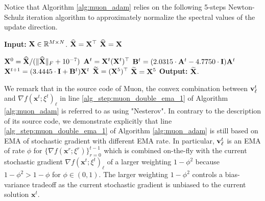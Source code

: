 \documentclass{article}
\theoremstyle{plain}
\theoremstyle{definition}
\theoremstyle{remark}
\def\bx{\mathbf{x}}
\begin{document}
Notice that Algorithm \ref{alg:muon_adam} relies on the following 5-steps Newton-Schulz iteration algorithm to approximately normalize the spectral values of the update direction.
\begin{algorithm}
\caption{Newton-Schulz5}
\begin{algorithmic}[1]
\STATE \textbf{Input:} ${\bf X} \in \mathbb{R}^{M\times N}$.
    \STATE $\widehat{\bf X} = {\bf X}^\top$
\ELSE
    \STATE $\widehat{\bf X} = {\bf X}$
\ENDIF

\STATE ${\bf X}^0 = \widehat{\bf X} / (\| \widehat{\bf X} \|_F + 10^{-7})$
            \STATE ${\bf A}^t = {\bf X}^t({\bf X}^t)^\top $
            \STATE ${\bf B}^t = ( 2.0315 \cdot {\bf A}^t-4.7750 \cdot {\bf I} ){\bf A}^t$
            \STATE ${\bf X}^{t+1} = (3.4445 \cdot {\bf I} + {\bf B}^t) {\bf X}^t$
        \ENDFOR
{}
    \STATE $\widetilde{\bf X} = ({\bf X}^5)^\top$
\ELSE
    \STATE $\widetilde{\bf X} = {\bf X}^5$
\ENDIF
\STATE \textbf{Output:} $\widetilde{\bf X}$.
\end{algorithmic}
\end{algorithm}

We remark that in the source code of Muon, the convex combination between ${\bf v}_\ell^t$ and $\nabla f(\bx^t; \xi^t)_\ell$ in line \ref{alg_step:muon_double_ema_1} of Algorithm \ref{alg:muon_adam} is referred to as using "Nesterov". In contrary to the description of its source code, we demonstrate explicitly that line \ref{alg_step:muon_double_ema_1} of Algorithm \ref{alg:muon_adam} is still based on EMA of stochastic gradient with different EMA rate. In particular, ${\bf v}_\ell^t$ is an EMA of rate $\phi$ for $\{\nabla f(\bx^r; \xi^r)\}_{r=0}^{t-1}$ which is combined on-the-fly with the current stochastic gradient $\nabla f(\bx^t; \xi^t)_\ell$ of a larger weighting $1 - \phi^2$ because $1 - \phi^2 > 1 - \phi$ for $\phi \in (0,1)$. The larger weighting $1 - \phi^2$ controls a bias-variance tradeoff as the current stochastic gradient is unbiased to the current solution $\bx^t$.
\end{document}
